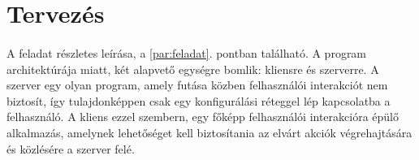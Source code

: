 \documentclass[12pt]{report}
\begin{document}
\section{Tervezés}
\paragraph{}
A  feladat részletes leírása, a \ref{par:feladat}. pontban található. A program architektúrája miatt, két alapvető egységre bomlik: kliensre és szerverre. A szerver egy olyan program, amely futása közben felhasználói interakciót nem biztosít, így tulajdonképpen csak egy konfigurálási réteggel lép kapcsolatba a felhasználó. A kliens ezzel szembern, egy főképp felhasználói interakcióra épülő alkalmazás, amelynek lehetőséget kell biztosítania az elvárt akciók végrehajtására és közlésére a szerver felé.
\end{document}
